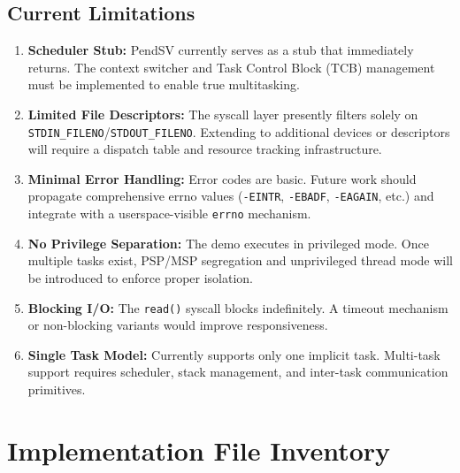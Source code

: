 \documentclass[11pt,a4paper]{article}
\begin{document}
\subsection{Current Limitations}
\begin{enumerate}[leftmargin=2em]
  \item \textbf{Scheduler Stub:} PendSV currently serves as a stub that immediately returns. The context switcher and Task Control Block (TCB) management must be implemented to enable true multitasking.
  
  \item \textbf{Limited File Descriptors:} The syscall layer presently filters solely on \texttt{STDIN\_FILENO}/\texttt{STDOUT\_FILENO}. Extending to additional devices or descriptors will require a dispatch table and resource tracking infrastructure.
  
  \item \textbf{Minimal Error Handling:} Error codes are basic. Future work should propagate comprehensive errno values (\texttt{-EINTR}, \texttt{-EBADF}, \texttt{-EAGAIN}, etc.) and integrate with a userspace-visible \texttt{errno} mechanism.
  
  \item \textbf{No Privilege Separation:} The demo executes in privileged mode. Once multiple tasks exist, PSP/MSP segregation and unprivileged thread mode will be introduced to enforce proper isolation.
  
  \item \textbf{Blocking I/O:} The \texttt{read()} syscall blocks indefinitely. A timeout mechanism or non-blocking variants would improve responsiveness.
  
  \item \textbf{Single Task Model:} Currently supports only one implicit task. Multi-task support requires scheduler, stack management, and inter-task communication primitives.
\end{enumerate}

\section{Implementation File Inventory}
\end{document}
